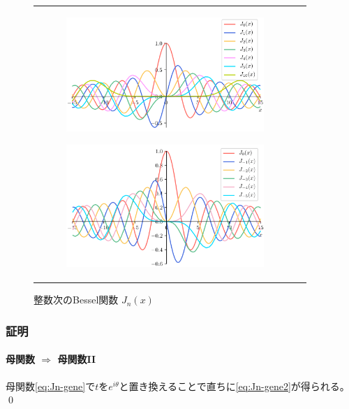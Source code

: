 \documentclass[../main/main]{subfiles}
\begin{document}
\begin{figure}[tb]
\begin{tabular}{cc}
\hspace{-24pt}
 \begin{minipage}{0.50\hsize}\small
    \begin{figure}[H]
      \centering
      \includegraphics[width=75mm]{../fig/bessel/bessel_n.png}
    \end{figure}
 \end{minipage}

 \begin{minipage}{0.50\hsize}
    \begin{figure}[H]
      \centering
      \includegraphics[width=75mm]{../fig/bessel/bessel_n_minus.png}
    \end{figure}
 \end{minipage}
\end{tabular}
\caption{	整数次のBessel関数 $J_n(x)$}
\end{figure}



\subsubsection*{証明}

\vspace{12pt}
\paragraph{母関数 $\Longrightarrow$ 母関数II}
母関数\eqref{eq:Jn-gene}で$t$を$ e^{i \theta}$と置き換えることで直ちに\eqref{eq:Jn-gene2}が得られる。
\qed
\end{document}
